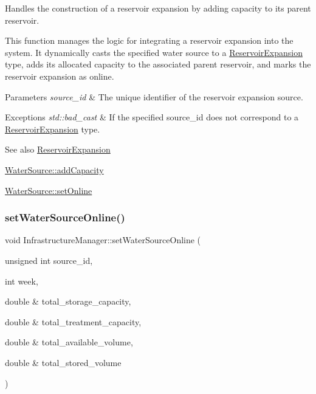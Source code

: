 Handles the construction of a reservoir expansion by adding capacity to its parent reservoir. 

This function manages the logic for integrating a reservoir expansion into the system. It dynamically casts the specified water source to a {\ttfamily \mbox{\hyperlink{classReservoirExpansion}{Reservoir\+Expansion}}} type, adds its allocated capacity to the associated parent reservoir, and marks the reservoir expansion as online.


\begin{DoxyParams}{Parameters}
{\em source\+\_\+id} & The unique identifier of the reservoir expansion source.\\
\hline
\end{DoxyParams}

\begin{DoxyExceptions}{Exceptions}
{\em std\+::bad\+\_\+cast} & If the specified {\ttfamily source\+\_\+id} does not correspond to a {\ttfamily \mbox{\hyperlink{classReservoirExpansion}{Reservoir\+Expansion}}} type.\\
\hline
\end{DoxyExceptions}
\begin{DoxySeeAlso}{See also}
\mbox{\hyperlink{classReservoirExpansion}{Reservoir\+Expansion}} 

\mbox{\hyperlink{classWaterSource_ab869abb3d3dde1875e933482bedc3ae3}{Water\+Source\+::add\+Capacity}} 

\mbox{\hyperlink{classWaterSource_aaa55dc6e14ff184380300147b53c56ec}{Water\+Source\+::set\+Online}} 
\end{DoxySeeAlso}
\mbox{\label{classInfrastructureManager_a9972a27ff6d08b7c1226d703ac700a94}} 
\subsubsection{\texorpdfstring{set\+Water\+Source\+Online()}{setWaterSourceOnline()}}
{\footnotesize\ttfamily void Infrastructure\+Manager\+::set\+Water\+Source\+Online (\begin{DoxyParamCaption}\item[{unsigned int}]{source\+\_\+id,  }\item[{int}]{week,  }\item[{double \&}]{total\+\_\+storage\+\_\+capacity,  }\item[{double \&}]{total\+\_\+treatment\+\_\+capacity,  }\item[{double \&}]{total\+\_\+available\+\_\+volume,  }\item[{double \&}]{total\+\_\+stored\+\_\+volume }\end{DoxyParamCaption})}



